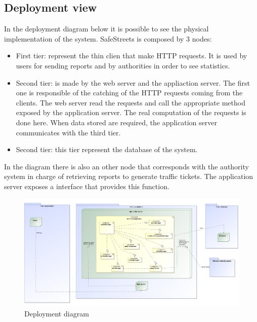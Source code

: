 \subsection{Deployment view}
In the deployment diagram below it is possible to see the physical implementation of the system.
SafeStreets is composed by 3 nodes:
\begin{itemize}
	\item 
	First tier: represent the thin clien that make HTTP requests. It is used by users for sending reports and by authorities in order to see statistics.
	\item 
	Second tier: is made by the web server and the appliaction server. The first one is responsible of the catching of the HTTP requests coming from the clients. The web server read the requests and call the appropriate method exposed by the application server. The real computation of the requests is done here.
	When data stored are required, the application server communicates with the third tier.
	\item 
	Second tier: this tier represent the database of the system. 
\end{itemize} 

In the diagram there is also an other node that corresponds with the authority system in charge of retrieving reports to generate traffic tickets. The application server exposes a interface that provides this function. 

\begin{figure}[H]
	\centering
	\includegraphics[width=1.12\linewidth]{Images/Deployment.png}
	\caption{Deployment diagram}
\end{figure}
